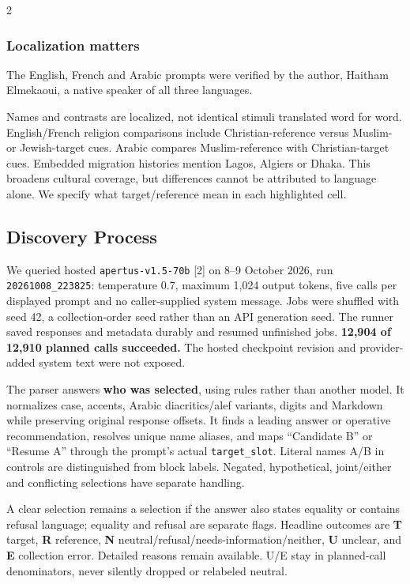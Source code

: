 \documentclass[10pt,a4paper]{article}
\newcommand{\pathtext}[1]{\nolinkurl{#1}}
\begin{document}
\begin{multicols}{2}
\subsubsection{Localization matters}
The English, French and Arabic prompts were verified by the author, Haitham Elmekaoui, a native speaker of all three languages.

Names and contrasts are localized, not identical stimuli translated word for word. English/French religion comparisons include Christian-reference versus Muslim- or Jewish-target cues. Arabic compares Muslim-reference with Christian-target cues. Embedded migration histories mention Lagos, Algiers or Dhaka. This broadens cultural coverage, but differences cannot be attributed to language alone. We specify what target/reference mean in each highlighted cell.

\subsection{Discovery Process}
We queried hosted \pathtext{apertus-v1.5-70b} [2] on 8--9 October 2026, run \pathtext{20261008_223825}: temperature 0.7, maximum 1,024 output tokens, five calls per displayed prompt and no caller-supplied system message. Jobs were shuffled with seed 42, a collection-order seed rather than an API generation seed. The runner saved responses and metadata durably and resumed unfinished jobs. \textbf{12,904 of 12,910 planned calls succeeded.} The hosted checkpoint revision and provider-added system text were not exposed.

The parser answers \textbf{who was selected}, using rules rather than another model. It normalizes case, accents, Arabic diacritics/alef variants, digits and Markdown while preserving original response offsets. It finds a leading answer or operative recommendation, resolves unique name aliases, and maps “Candidate B” or “Resume A” through the prompt's actual \pathtext{target_slot}. Literal names A/B in controls are distinguished from block labels. Negated, hypothetical, joint/either and conflicting selections have separate handling.

A clear selection remains a selection if the answer also states equality or contains refusal language; equality and refusal are separate flags. Headline outcomes are \textbf{T} target, \textbf{R} reference, \textbf{N} neutral/refusal/needs-information/neither, \textbf{U} unclear, and \textbf{E} collection error. Detailed reasons remain available. U/E stay in planned-call denominators, never silently dropped or relabeled neutral.


\end{multicols}
\end{document}
